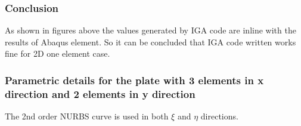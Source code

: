 \documentclass[11pt]{article}
\begin{document}
\subsubsection{Conclusion}
As shown in figures above the values generated by IGA code are inline with the results of Abaqus element. So it can be concluded that IGA code written works fine for 2D one element case.

\subsubsection{Parametric details for the plate with 3 elements in x direction and  2 elements in y direction}
The 2nd order NURBS curve is used in both $\xi$ and $\eta$ directions. \\
\begin{comment}
The knot vectors along $\xi$ and $\eta$ directions are \\
$\Xi= [0,0,1,1]$ and $\eta= [0,0,1,1]$. \\
Control points along $\xi$ direction is given by \\
$n_{cp}(\xi)$ = total number of knots in $[\Xi] - (p+1) = 2$.\\
Similarly the total number of control points along $\eta$ direction is given
by\\ $n_{cp}(\eta)$ = total number of knots in $[H ]- (q+1) = 2$ . \\
The total number of control points which defines the surface is\\
$n_{cp}$ = $n_{cp}(\xi) * n_{cp}(\eta)$ which is $2*2 = 4$. \\
\end{comment}
\begin{comment}
\item Control points net for the geometry \\
P = [[[0,0,0,1],[L,0,0,1]],
[[0,L,0,1],[L,L,0,1]]]

$$
P = \begin{bmatrix}
[0,0,0,1] & [L,0,0,1] \\
[L,0,0,1] & [L,L,0,1] \\
\end{bmatrix} 
$$

\end{enumerate}
\end{comment}
\end{document}
